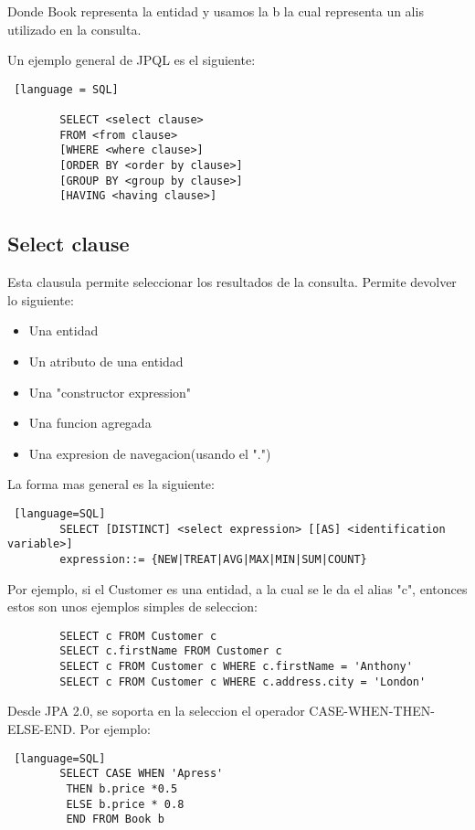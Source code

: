 \documentclass{article}
\begin{document}
Donde Book representa la entidad y usamos la b la cual representa un alis utilizado en la consulta.

Un ejemplo general de JPQL es el siguiente:

\begin{lstlisting} [language = SQL]

        SELECT <select clause>
        FROM <from clause>
        [WHERE <where clause>]
        [ORDER BY <order by clause>]
        [GROUP BY <group by clause>]
        [HAVING <having clause>]
\end{lstlisting}

\subsection*{Select clause}

Esta clausula permite seleccionar los resultados de la consulta. Permite devolver lo siguiente:
\begin{itemize}
	\item Una entidad
	\item Un atributo de una entidad
	\item Una "constructor expression"
	\item Una funcion agregada
	\item Una expresion de navegacion(usando el ".")
\end{itemize}

La forma mas general es la siguiente:
\begin{lstlisting} [language=SQL]
        SELECT [DISTINCT] <select expression> [[AS] <identification variable>]
        expression::= {NEW|TREAT|AVG|MAX|MIN|SUM|COUNT}
    \end{lstlisting}

Por ejemplo, si el Customer es una entidad, a la cual se le da el alias "c", entonces estos son unos ejemplos simples de seleccion:

\begin{lstlisting}
        SELECT c FROM Customer c
        SELECT c.firstName FROM Customer c
        SELECT c FROM Customer c WHERE c.firstName = 'Anthony'
        SELECT c FROM Customer c WHERE c.address.city = 'London'
    \end{lstlisting}

Desde JPA 2.0, se soporta en la seleccion el operador CASE-WHEN-THEN-ELSE-END. Por ejemplo:

\begin{lstlisting} [language=SQL]
        SELECT CASE WHEN 'Apress'
         THEN b.price *0.5
         ELSE b.price * 0.8
         END FROM Book b
         \end{lstlisting}
\end{document}
